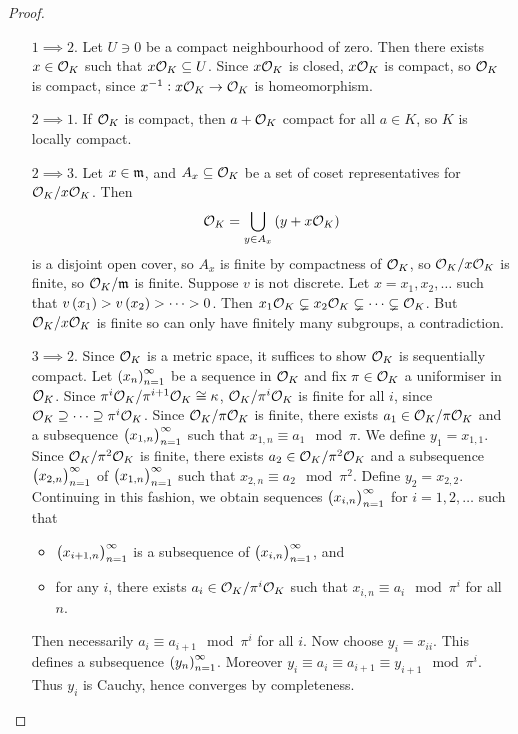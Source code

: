 \begin{proof}
\hfill
\begin{itemize}[leftmargin=0.5in]
\item[$ 1 \implies 2 $.] Let $ U \ni 0 $ be a compact neighbourhood of zero. Then there exists $ x \in \mathcal{O}_K $ such that $ x\mathcal{O}_K \subseteq U $. Since $ x\mathcal{O}_K $ is closed, $ x\mathcal{O}_K $ is compact, so $ \mathcal{O}_K $ is compact, since $ x^{-1} : x\mathcal{O}_K \to \mathcal{O}_K $ is homeomorphism.
\item[$ 2 \implies 1 $.] If $ \mathcal{O}_K $ is compact, then $ a + \mathcal{O}_K $ compact for all $ a \in K $, so $ K $ is locally compact.
\item[$ 2 \implies 3 $.] Let $ x \in \mathfrak{m} $, and $ A_x \subseteq \mathcal{O}_K $ be a set of coset representatives for $ \mathcal{O}_K / x\mathcal{O}_K $. Then
$$ \OOO_K = \bigcup_{y \in A_x} \br{y + x\OOO_K} $$
is a disjoint open cover, so $ A_x $ is finite by compactness of $ \mathcal{O}_K $, so $ \mathcal{O}_K / x\mathcal{O}_K $ is finite, so $ \mathcal{O}_K / \mathfrak{m} $ is finite. Suppose $ v $ is not discrete. Let $ x = x_1, x_2, \dots $ such that $ v\br{x_1} > v\br{x_2} > \dots > 0 $. Then $ x_1\mathcal{O}_K \subsetneq x_2\mathcal{O}_K \subsetneq \dots \subsetneq \mathcal{O}_K $. But $ \mathcal{O}_K / x\mathcal{O}_K $ is finite so can only have finitely many subgroups, a contradiction.
\item[$ 3 \implies 2 $.] Since $ \mathcal{O}_K $ is a metric space, it suffices to show $ \mathcal{O}_K $ is sequentially compact. Let $ \br{x_n}_{n = 1}^\infty $ be a sequence in $ \mathcal{O}_K $ and fix $ \pi \in \mathcal{O}_K $ a uniformiser in $ \mathcal{O}_K $. Since $ \pi^i\mathcal{O}_K / \pi^{i + 1}\mathcal{O}_K \cong \kappa $, $ \mathcal{O}_K / \pi^i\mathcal{O}_K $ is finite for all $ i $, since $ \mathcal{O}_K \supseteq \dots \supseteq \pi^i\mathcal{O}_K $. Since $ \mathcal{O}_K / \pi\mathcal{O}_K $ is finite, there exists $ a_1 \in \mathcal{O}_K / \pi\mathcal{O}_K $ and a subsequence $ \br{x_{1, n}}_{n = 1}^\infty $ such that $ x_{1, n} \equiv a_1 \mod \pi $. We define $ y_1 = x_{1, 1} $. Since $ \mathcal{O}_K / \pi^2\mathcal{O}_K $ is finite, there exists $ a_2 \in \mathcal{O}_K / \pi^2\mathcal{O}_K $ and a subsequence $ \br{x_{2, n}}_{n = 1}^\infty $ of $ \br{x_{1, n}}_{n = 1}^\infty $ such that $ x_{2, n} \equiv a_2 \mod \pi^2 $. Define $ y_2 = x_{2, 2} $. Continuing in this fashion, we obtain sequences $ \br{x_{i, n}}_{n = 1}^\infty $ for $ i = 1, 2, \dots $ such that
\begin{itemize}
\item $ \br{x_{i + 1, n}}_{n = 1}^\infty $ is a subsequence of $ \br{x_{i, n}}_{n = 1}^\infty $, and
\item for any $ i $, there exists $ a_i \in \mathcal{O}_K / \pi^i\mathcal{O}_K $ such that $ x_{i, n} \equiv a_i \mod \pi^i $ for all $ n $.
\end{itemize}
Then necessarily $ a_i \equiv a_{i + 1} \mod \pi^i $ for all $ i $. Now choose $ y_i = x_{ii} $. This defines a subsequence $ \br{y_n}_{n = 1}^\infty $. Moreover $ y_i \equiv a_i \equiv a_{i + 1} \equiv y_{i + 1} \mod \pi^i $. Thus $ y_i $ is Cauchy, hence converges by completeness.
\end{itemize}
\end{proof}

